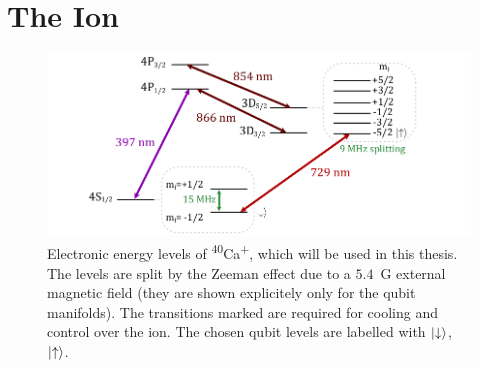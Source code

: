 \section{The Ion}
\label{sec:Transitions}
    \begin{figure}[ht]
        \begin{center}
        \noindent\includegraphics[width=\linewidth]{figures/pdf_figure/ion.pdf}
        \end{center}
        \caption{
        Electronic energy levels of \textsuperscript{40}Ca\textsuperscript{+},
        which will be used in this thesis. The levels are
        split by the Zeeman effect due to a $5.4$~G external magnetic field (they are shown explicitely only for the qubit manifolds). The
        transitions marked are required for cooling and control over the
        ion. The chosen qubit levels are labelled with $\ket{\downarrow}$, $\ket{\uparrow}$.
        }

    \label{fig:ion}
    \end{figure}

